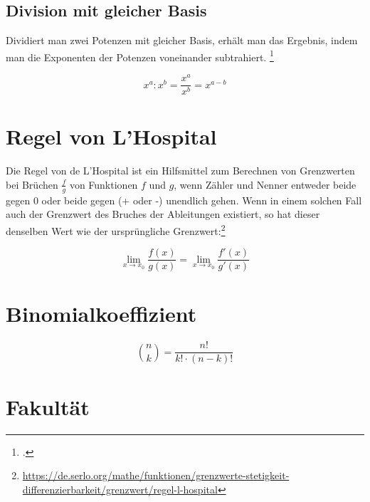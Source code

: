 \documentclass{lehramt-informatik-haupt}
\begin{document}
%

\subsection{Division mit gleicher Basis}

Dividiert man zwei Potenzen mit gleicher Basis, erhält man das Ergebnis,
indem man die Exponenten der Potenzen voneinander subtrahiert.
\footcite[/potenzgesetze]{net:html:mathebibel}

\begin{displaymath}
x^a : x^b = \frac{x^a}{x^b} = x^{a-b}
\end{displaymath}

%

\section{Regel von L’Hospital}

Die Regel von de L’Hospital ist ein Hilfsmittel zum Berechnen von
Grenzwerten bei Brüchen $\frac{f}{g}$ von Funktionen $f$ und $g$, wenn
Zähler und Nenner entweder beide gegen $0$ oder beide gegen (+ oder -)
unendlich gehen. Wenn in einem solchen Fall auch der Grenzwert des
Bruches der Ableitungen existiert, so hat dieser denselben Wert wie der
ursprüngliche Grenzwert:\footnote{\url{https://de.serlo.org/mathe/funktionen/grenzwerte-stetigkeit-differenzierbarkeit/grenzwert/regel-l-hospital}}

\begin{displaymath}
\lim_{x \to x_0} \frac{f(x)}{g(x)} = \lim_{x \to x_0} \frac{f'(x)}{g'(x)}
\end{displaymath}

%

\section{Binomialkoeffizient}

\begin{displaymath}
\binom nk = \frac{n!}{k! \cdot (n-k)!}
\end{displaymath}

\section{Fakultät}
\end{document}
